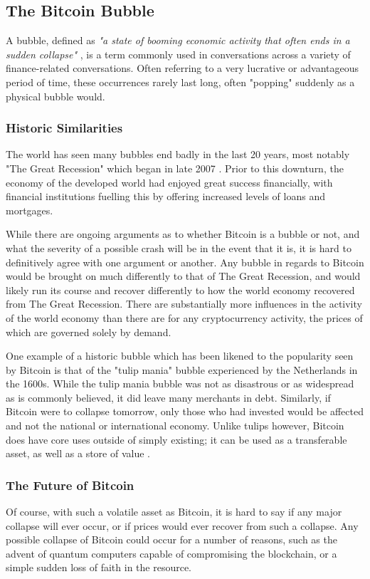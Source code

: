 \subsection{The Bitcoin Bubble}
A bubble, defined as \textit{"a state of booming economic activity that often ends in a sudden collapse"} \cite{bubbledef}, is a term commonly used in conversations across a variety of finance-related conversations. Often referring to a very lucrative or advantageous period of time, these occurrences rarely last long, often "popping" suddenly as a physical bubble would.

\subsubsection{Historic Similarities}
The world has seen many bubbles end badly in the last 20 years, most notably "The Great Recession" which began in late 2007 \cite{greatrecession}. Prior to this downturn, the economy of the developed world had enjoyed great success financially, with financial institutions fuelling this by offering increased levels of loans and mortgages. 

While there are ongoing arguments as to whether Bitcoin is a bubble or not, and what the severity of a possible crash will be in the event that it is, it is hard to definitively agree with one argument or another. Any bubble in regards to Bitcoin would be brought on much differently to that of The Great Recession, and would likely run its course and recover differently to how the world economy recovered from The Great Recession. There are substantially more influences in the activity of the world economy than there are for any cryptocurrency activity, the prices of which are governed solely by demand.

One example of a historic bubble which has been likened to the popularity seen by Bitcoin is that of the "tulip mania" bubble experienced by the Netherlands in the 1600s. While the tulip mania bubble was not as disastrous or as widespread as is commonly believed, it did leave many merchants in debt. Similarly, if Bitcoin were to collapse tomorrow, only those who had invested would be affected and not the national or international economy. Unlike tulips however, Bitcoin does have core uses outside of simply existing; it can be used as a transferable asset, as well as a store of value \cite{tulipmania}. 
\subsubsection{The Future of Bitcoin}
Of course, with such a volatile asset as Bitcoin, it is hard to say if any major collapse will ever occur, or if prices would ever recover from such a collapse. Any possible collapse of Bitcoin could occur for a number of reasons, such as the advent of quantum computers capable of compromising the blockchain, or a simple sudden loss of faith in the resource.

